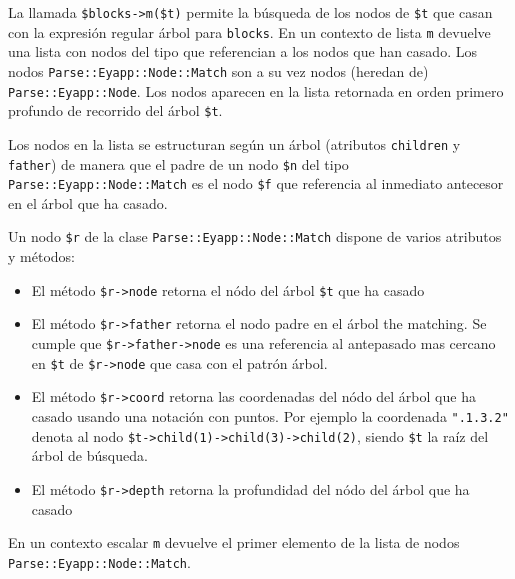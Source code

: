 La llamada \verb|$blocks->m($t)| permite la búsqueda 
de los nodos de \verb|$t| que casan con la expresión regular árbol para \verb|blocks|.
En un contexto de lista \verb|m| devuelve una 
lista con nodos del
tipo  que referencian
a los nodos que han casado. 
Los nodos \verb|Parse::Eyapp::Node::Match|
son a su vez nodos (heredan de) 
\verb|Parse::Eyapp::Node|.
Los nodos 
aparecen en la lista retornada en orden primero profundo de 
recorrido del árbol \verb|$t|.

Los nodos en la lista
se estructuran según un árbol (atributos \verb|children| y \verb|father|)
de manera que el padre
de un nodo \verb|$n| del tipo \verb|Parse::Eyapp::Node::Match| es el 
nodo \verb|$f| que referencia al inmediato antecesor 
en el árbol que ha casado. 

Un nodo \verb|$r| de la clase 
\verb|Parse::Eyapp::Node::Match| dispone de varios atributos
y métodos:
\begin{itemize}
\item
El método \verb|$r->node| retorna el nódo del árbol \verb|$t| que ha casado
\item
El método \verb|$r->father| retorna el nodo padre en el árbol the matching.
Se cumple que \verb|$r->father->node| es 
una referencia al antepasado mas cercano en \verb|$t|
de  \verb|$r->node| que casa con el patrón árbol.
\item
El método \verb|$r->coord| retorna las coordenadas del nódo del árbol que ha casado
usando una notación con puntos. Por ejemplo la coordenada
\verb|".1.3.2"| 
denota al nodo \verb|$t->child(1)->child(3)->child(2)|, siendo \verb|$t|
la raíz del árbol de búsqueda.
\item
El método \verb|$r->depth| retorna la profundidad del nódo del árbol que ha casado
\end{itemize}

En un contexto escalar \verb|m| devuelve el primer
elemento de la lista de nodos \verb|Parse::Eyapp::Node::Match|.

